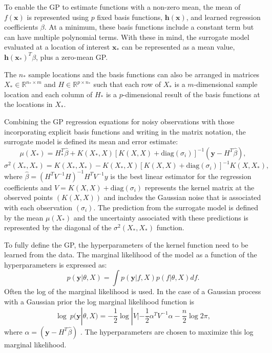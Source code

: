To enable the GP to estimate functions with a non-zero mean, the mean of $f(\mathbf{x})$ is represented using $p$ fixed basis functions, $\mathbf{h(x)}$, and learned regression coefficients $\beta$.
At a minimum, these basis functions include a constant term but can have multiple polynomial terms.
With these in mind, the surrogate model evaluated at a location of interest $\mathbf{x}_*$ can be represented as a mean value, $\mathbf{h(\mathbf{x}_*)}^T\beta$, plus a zero-mean GP.

The $n_*$ sample locations and the basis functions can also be arranged in matrices $X_* \in \mathbb{R} ^{ n_* \times m}$ and $H \in \mathbb{R} ^{ p \times n_*}$ such that each row of $X_*$ is a $m$-dimensional sample location and each column of $H_*$ is a $p$-dimensional result of the basis functions at the locations in $X_*$.

Combining the GP regression equations for noisy observations with those incorporating explicit basis functions and writing in the matrix notation, the surrogate model is defined its mean and error estimate:
\begin{equation} \label{equ:mu_gpr}
    \mu(X_*) = H_*^T\hat{\beta} + K(X_*,X)[K(X,X)+\text{diag}(\sigma_i)]^{-1} (\mathbf{y}-H^T\hat{\beta}), 
\end{equation}
\begin{equation} \label{equ:sig_gpr}
    \sigma^2(X_*,X_*) = K(X_*,X_*) - K(X_*,X)[K(X,X)+\text{diag}(\sigma_i)]^{-1} K(X,X_*), 
\end{equation}
where $\hat{\beta} = (H^TV^{-1}H)^{-1}H^TV^{-1}y$ is the best linear estimator for the regression coefficients and $V = K(X,X) + \text{diag}(\sigma_i)$ represents the kernel matrix at the observed points $\left ( K(X,X) \right )$ and includes the Gaussian noise that is associated with each observation $\left ( \sigma_i \right )$.
The prediction from the surrogate model is defined by the mean $\mu(X_*)$ and the uncertainty associated with these predictions is represented by the diagonal of the $\sigma^2(X_*,X_*)$ function.

To fully define the GP, the hyperparameters of the kernel function need to be learned from the data.
The marginal likelihood of the model as a function of the hyperparameters is expressed as:
\begin{equation}
    p(\mathbf{y}|\theta,X) = \int p(\mathbf{y}|f,X) p(f|\theta,X) df.
\end{equation}
Often the log of the marginal likelihood is used. 
In the case of a Gaussian process with a Gaussian prior the log marginal likelihood function is
\begin{equation} \label{equ:hyp_param_sf}
    \log~p(\mathbf{y}|\theta,X) = -\frac{1}{2} \log|V| - \frac{1}{2}\alpha^T V^{-1}\alpha - \frac{n}{2}\log 2\pi,
\end{equation}
where $\alpha = \left ( \mathbf{y}-H^T\hat{\beta} \right )$ \cite{rasmussen_gaussian_2006}.
The hyperparameters are chosen to maximize this log marginal likelihood. 


